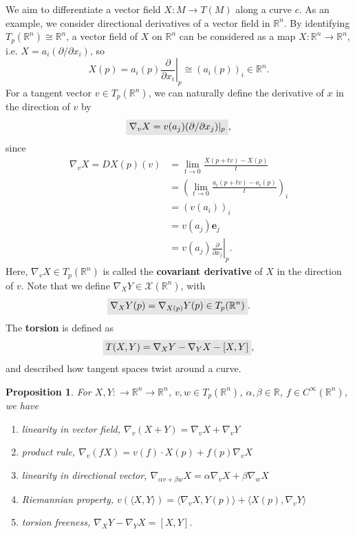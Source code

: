 \documentclass[letter-paper]{tufte-book}
\newtheorem{proposition}[theorem]{\color{pastel-blue}Proposition}
\newcommand{\highlight}[1]{\mathchoice%
  {\colorbox{black!10}{$\displaystyle#1$}}%
  {\colorbox{black!10}{$\textstyle#1$}}%
  {\colorbox{black!10}{$\scriptstyle#1$}}%
  {\colorbox{black!10}{$\scriptscriptstyle#1$}}}%
\begin{document}
We aim to differentiate a vector field $X: M\to T(M)$ along a curve $c$. As an example, we consider directional derivatives of a vector field in $\mathbb{R}^n$. By identifying $T_p(\mathbb{R}^n) \cong \mathbb{R}^n$, a vector field of $X$ on $\mathbb{R}^n$ can be considered as a map $X:\mathbb{R}^n \to \mathbb{R}^n$, i.e. $X = a_i(\partial / \partial x_i)$, so
\begin{equation*}
  X(p) = a_i(p) \left.\frac{\partial}{\partial x_i}\right|_p \cong (a_i(p))_i \in \mathbb{R}^n.
\end{equation*}
For a tangent vector $v \in T_p(\mathbb{R}^n)$, we can naturally define the derivative of $x$ in the direction of $v$ by
\begin{equation}
  \highlight{\nabla_v X = v(a_j)(\partial / \partial x_j)|_p},
\end{equation}
since
\begin{align*}
  \nabla_v X = DX(p)(v) 
    &= \lim_{t\to 0} \frac{X(p+tv) - X(p)}{t} \\
    &= \left(\lim_{t\to 0} \frac{a_i(p+tv) - a_i(p)}{t}\right)_i\\
    &= (v(a_i))_i \\
    &= v(a_j)\boldsymbol{e}_j \\
    &= v(a_j) \left.\frac{\partial}{\partial x_j}\right|_p.
\end{align*}
Here, $\nabla_v X \in T_p(\mathbb{R}^n)$ is called the \textbf{covariant derivative} of $X$ in the direction of $v$. Note that we define $\nabla_X Y \in \mathcal{X}(\mathbb{R}^n)$, with
\begin{equation}
  \highlight{\nabla_X Y(p) = \nabla_{X(p)}Y(p) \in T_p(\mathbb{R}^n)}.
\end{equation}
The \textbf{torsion} is defined as
\begin{equation}
  \highlight{T(X,Y) = \nabla_X Y - \nabla_Y X -  [X, Y]},
\end{equation}
and described how tangent spaces twist around a curve.

\begin{proposition}
  For $X,Y: \to \mathbb{R}^n \to \mathbb{R}^n$, $v,w\in T_p(\mathbb{R}^n)$, $\alpha,\beta\in \mathbb{R}$, $f\in C^\infty(\mathbb{R}^n)$, we have
  \begin{enumerate}
    \item linearity in vector field, $\nabla_v (X+Y) = \nabla_v X + \nabla_v Y$
    \item product rule, $\nabla_v (fX) = v(f)\cdot X(p) + f(p)\nabla_v X$
    \item linearity in directional vector, $\nabla_{\alpha v+\beta w} X = \alpha \nabla_v X + \beta\nabla_w X$
    \item Riemannian property, $v(\langle X, Y\rangle) = \langle \nabla_v X, Y(p)\rangle + \langle X(p), \nabla_v Y\rangle$
    \item torsion freeness, $\nabla_X Y - \nabla_Y X = [X, Y]$.
  \end{enumerate}
\end{proposition}
\end{document}
